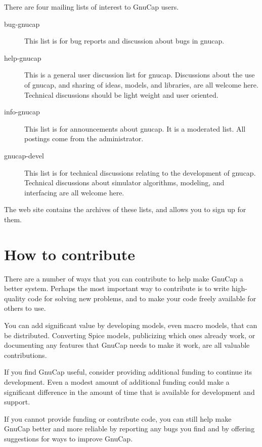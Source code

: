 There are four mailing lists of interest to GnuCap users.
\begin{description}

\item[bug-gnucap]
This list is for bug reports and discussion about bugs in gnucap.

\item[help-gnucap]
This is a general user discussion list for gnucap. Discussions about
the use of gnucap, and sharing of ideas, models, and libraries, are
all welcome here.  Technical discussions should be light weight and
user oriented.

\item[info-gnucap]
This list is for announcements about gnucap. It is a moderated
list. All postings come from the administrator.

\item[gnucap-devel]
This list is for technical discussions relating to the development of
gnucap.  Technical discussions about simulator algorithms, modeling,
and interfacing are all welcome here.

\end{description}

The web site contains the archives of these lists, and allows you to
sign up for them.
\section{How to contribute}

There are a number of ways that you can contribute to help make GnuCap
a better system. Perhaps the most important way to contribute is to
write high-quality code for solving new problems, and to make your
code freely available for others to use.

You can add significant value by developing models, even macro models,
that can be distributed. Converting Spice models, publicizing which
ones already work, or documenting any features that GnuCap needs to
make it work, are all valuable contributions.

If you find GnuCap useful, consider providing additional funding to
continue its development. Even a modest amount of additional funding
could make a significant difference in the amount of time that is
available for development and support.

If you cannot provide funding or contribute code, you can still help
make GnuCap better and more reliable by reporting any bugs you find
and by offering suggestions for ways to improve GnuCap.


